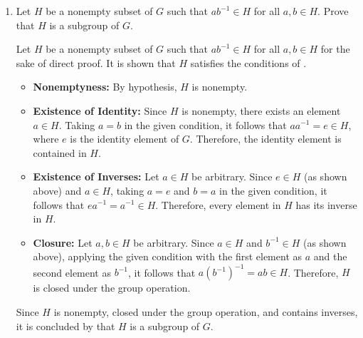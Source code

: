 \begin{enumerate}
\begin{subprove}
    Since $G = (g)$ and $g \in G$, it is concluded by definition of  that $G$ is cyclic, 
    with $g$ as a generator.
    
    In both cases, it is shown that $G$ is cyclic.
    Since $g$ was an arbitrary non-identity element of $G$ in Case 2, 
    it follows that every non-identity element of $G$ generates $G$.
  \end{subprove}







  
  \item Let $H$ be a nonempty subset of $G$ such that $a b^{-1} \in H$ for all $a, b \in H$. Prove that $H$ is a subgroup of $G$.
  \begin{subprove}
    Let $H$ be a nonempty subset of $G$ such that $a b^{-1} \in H$ for all $a, b \in H$ for the sake of direct proof.
    It is shown that $H$ satisfies the conditions of .
    
    \begin{itemize}
      \item \textbf{Nonemptyness:} By hypothesis, $H$ is nonempty.
      
      \item \textbf{Existence of Identity:} Since $H$ is nonempty, there exists an element $a \in H$.
      Taking $a = b$ in the given condition, it follows that $a a^{-1} = e \in H$, where $e$ is the identity element of $G$.
      Therefore, the identity element is contained in $H$.
      
      \item \textbf{Existence of Inverses:} Let $a \in H$ be arbitrary.
      Since $e \in H$ (as shown above) and $a \in H$, taking $a = e$ and $b = a$ in the given condition, 
      it follows that $e a^{-1} = a^{-1} \in H$.
      Therefore, every element in $H$ has its inverse in $H$.
      
      \item \textbf{Closure:} Let $a, b \in H$ be arbitrary.
      Since $a \in H$ and $b^{-1} \in H$ (as shown above), applying the given condition with the first element as $a$ and the second element as $b^{-1}$,
      it follows that $a (b^{-1})^{-1} = a b \in H$.
      Therefore, $H$ is closed under the group operation.
    \end{itemize}
    
    Since $H$ is nonempty, closed under the group operation, and contains inverses, 
    it is concluded by  that $H$ is a subgroup of $G$.
  \end{subprove}









\end{enumerate}
